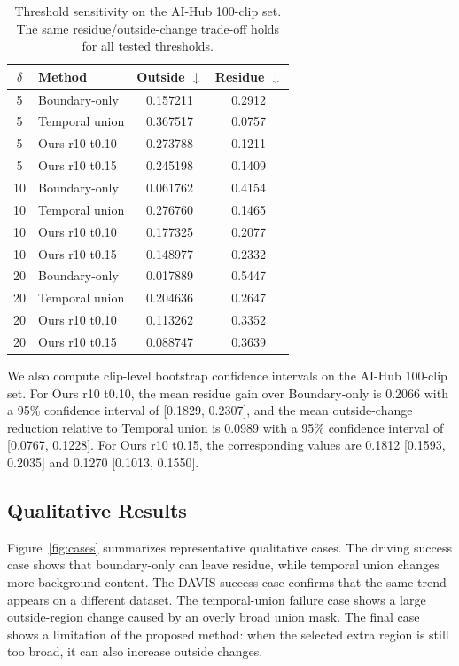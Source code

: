 \documentclass[nouppercase]{kaia}
\begin{document}
\begin{table}[h]
\begin{center}
\begin{tabular}{|c|l|c|c|}
\hline
$\delta$ & Method & Outside $\downarrow$ & Residue $\downarrow$ \\
\hline\hline
5 & Boundary-only & 0.157211 & 0.2912 \\
5 & Temporal union & 0.367517 & 0.0757 \\
5 & Ours r10 t0.10 & 0.273788 & 0.1211 \\
5 & Ours r10 t0.15 & 0.245198 & 0.1409 \\
\hline
10 & Boundary-only & 0.061762 & 0.4154 \\
10 & Temporal union & 0.276760 & 0.1465 \\
10 & Ours r10 t0.10 & 0.177325 & 0.2077 \\
10 & Ours r10 t0.15 & 0.148977 & 0.2332 \\
\hline
20 & Boundary-only & 0.017889 & 0.5447 \\
20 & Temporal union & 0.204636 & 0.2647 \\
20 & Ours r10 t0.10 & 0.113262 & 0.3352 \\
20 & Ours r10 t0.15 & 0.088747 & 0.3639 \\
\hline
\end{tabular}
\end{center}
\caption{Threshold sensitivity on the AI-Hub 100-clip set. The same residue/outside-change trade-off holds for all tested thresholds.}
\label{tab:threshold}
\end{table}

We also compute clip-level bootstrap confidence intervals on the AI-Hub 100-clip set. For Ours r10 t0.10, the mean residue gain over Boundary-only is 0.2066 with a 95\% confidence interval of [0.1829, 0.2307], and the mean outside-change reduction relative to Temporal union is 0.0989 with a 95\% confidence interval of [0.0767, 0.1228]. For Ours r10 t0.15, the corresponding values are 0.1812 [0.1593, 0.2035] and 0.1270 [0.1013, 0.1550].

\subsection{Qualitative Results}
Figure~\ref{fig:cases} summarizes representative qualitative cases. The driving success case shows that boundary-only can leave residue, while temporal union changes more background content. The DAVIS success case confirms that the same trend appears on a different dataset. The temporal-union failure case shows a large outside-region change caused by an overly broad union mask. The final case shows a limitation of the proposed method: when the selected extra region is still too broad, it can also increase outside changes.
\end{document}
